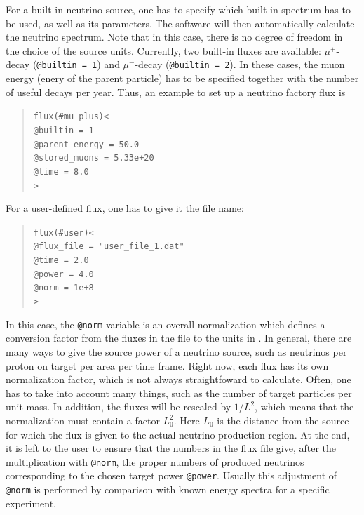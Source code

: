 For a built-in neutrino source, one has to specify which
built-in spectrum has to be used, as well as its parameters. The software
will then automatically calculate the neutrino spectrum. Note that in this
case, there is no degree of freedom in the choice of the source units.
Currently, two built-in fluxes are available: $\mu^+$-decay ({\tt @builtin = 1}) and $\mu^-$-decay ({\tt @builtin = 2}). In these cases, the muon energy (enery of the parent particle) has to be specified together with the number of useful decays  per year. Thus, an example to set up a neutrino factory flux is
\begin{quote}
{\tt flux(\#mu\_plus)<\\
\tb  @builtin = 1\\
\tb  @parent\_energy = 50.0\\
\tb  @stored\_muons = 5.33e+20\\
\tb  @time = 8.0\\
>}
\end{quote}
%
For a user-defined flux, one has to give it the file name:
\begin{quote}
{\tt flux(\#user)<}\\
{\tt \tb @flux\_file = "user\_file\_1.dat"\\
\tb @time = 2.0\\
\tb @power = 4.0\\
\tb @norm = 1e+8}\\
{\tt >}
\end{quote}
In this case, the {\tt @norm} variable is an overall normalization which defines a conversion factor from the fluxes in the file to the units in \GLOBES . In general, there are many ways to give the source power of a 
neutrino source, such as neutrinos per proton on target per area per time frame. Right now, each flux has its own normalization factor, which is
not always straightfoward to calculate. Often, one has to take into account
many things, such as the number of target particles per unit mass. 
In addition, the fluxes will be rescaled by $1/L^2$, which means that the
normalization must contain a factor $L_0^2$. Here $L_0$ is the distance from the source for which the flux is given to the actual neutrino production region. At the end, it is left to the user to ensure that the 
numbers in the flux file give, after the multiplication with {\tt @norm}, 
the proper numbers of produced neutrinos corresponding to the chosen target power {\tt @power}. Usually this adjustment of {\tt @norm} is performed by comparison with known energy spectra for a specific experiment.

